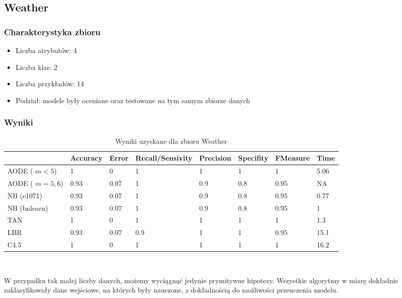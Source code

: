 \documentclass[16]{article}
\begin{document}
\subsection{Weather}

\subsubsection{Charakterystyka zbioru}

\begin{itemize}
	\item Liczba atrybutów: 4
	\item Liczba klas: 2
	\item Liczba przykładów: 14
	\item Podział: modele były oceniane oraz testowane na tym samym zbiorze danych
\end{itemize}

\subsubsection{Wyniki}

\begin{table}[ht]
\begin{center}
\begin{tabular}{ |l|l|l|l|l|l|l|l| }
\hline
&  Accuracy & Error & Recall/Sensivity & Precision & Specifity & FMeasure & Time
\\ \hline
AODE ( $m < 5$)& 1 & 0 & 1 & 1 & 1 & 1 & 5.06
\\ \hline
AODE ( $m = 5, 6$) & 0.93 & 0.07 & 1 & 0.9 & 0.8 & 0.95 & NA
\\ \hline
NB (e1071) & 0.93 & 0.07 & 1 & 0.9 & 0.8 & 0.95 & 0.77
\\ \hline
NB (bnlearn) & 0.93 & 0.07 & 1 & 0.9 & 0.8 & 0.95 & 1
\\ \hline
TAN & 1 & 0 & 1 & 1 & 1 & 1 & 1.3
\\ \hline
LBR & 0.93 & 0.07 & 0.9 & 1 & 1 & 0.95 & 15.1
\\ \hline
C4.5 & 1 & 0 & 1 & 1 & 1 & 1 & 16.2
\\ \hline
\end{tabular}
\\\caption{Wyniki uzyskane dla zbioru Weather}
\end{center}
\end{table}

W przypadku tak małej liczby danych, możemy wyciągnąć jedynie prymitywne hipotezy. Wszystkie algorytmy w miarę dokładnie zaklasyfikowały dane wejściowe, na których były nauczone, z dokładnością do możliwości przeuczenia modelu.
\end{document}
